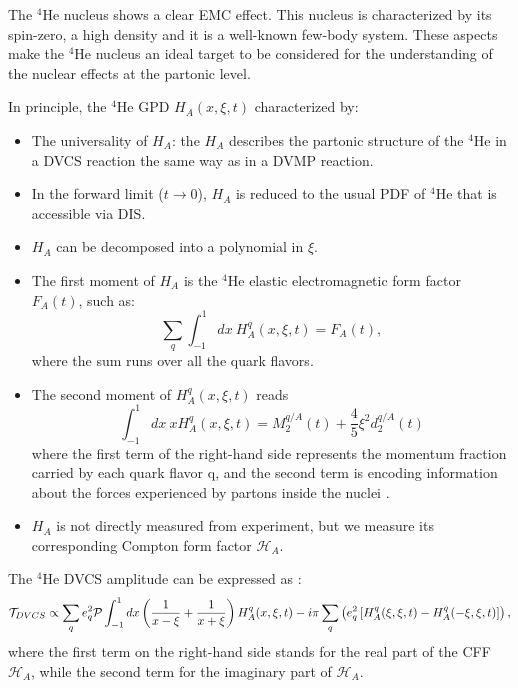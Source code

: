 The $^4$He nucleus shows a clear EMC effect. This nucleus is characterized by its spin-zero, a high density and it is a well-known few-body system. These aspects make the $^4$He nucleus an ideal target to be considered for the understanding of the nuclear effects at the partonic level.  
  
  In principle, the $^4$He GPD $H_{A}(x,\xi,t)$ characterized by:
 \begin{itemize}
 \item The universality of $H_{A}$: the $H_{A}$ describes the partonic structure of the $^4$He in a DVCS reaction the same way as in a DVMP reaction. 
 \item In the forward limit ($t\rightarrow 0$), $H_{A}$ is reduced to the usual PDF of $^4$He that is accessible via DIS.
 \item $H_{A}$ can be decomposed into a polynomial in $\xi$.
 \item The first moment of $H_{A}$ is the $^4$He elastic electromagnetic form factor $F_{A}(t)$, such as:
 \begin{equation}
   \sum_{q} \int_{-1}^{1} dx ~H_{A}^{q}(x, \xi, t) =  F_{A}(t),
\end{equation}
  where the sum runs over all the quark flavors.
  \item The second moment of $H_{A}^{q}(x, \xi, t)$ reads
  \begin{equation}
  \int_{-1}^{1} dx ~x H_{A}^{q}(x, \xi, t) = M ^{q/A}_{2}(t) + \frac{4}{5} \xi^{2} d^{q/A}_{2}(t)
  \end{equation}
    where the first term of the right-hand side represents the momentum fraction carried by each quark flavor q, and the second term is encoding information about the forces experienced by partons inside the nuclei \cite{M_Polyakov}. 
  \item $H_{A}$ is not directly measured from experiment, but we measure its corresponding Compton form factor $\mathcal{H}_{A}$. 
\end{itemize}  

The $^4$He DVCS amplitude can be expressed as \cite{Kir}:
 \begin{equation}
 \mathcal{T}_{DVCS} \propto \sum_{q} e^{2}_{q} \mathcal{P} \int_{-1}^{1} dx \left(\frac{1}{x-\xi} + \frac{1}{x+\xi} \right) H^{q}_{A}(x,\xi,t) \\- i\pi \sum_{q} \left( e^{2}_{q} \left[ H^{q}_{A}(\xi,\xi,t) - H^{q}_{A}(-\xi,\xi,t) \right] \right),
\end{equation}
 where the first term on the right-hand side stands for the real part of the CFF $\mathcal{H}_{A}$, while the second term for the imaginary part of $\mathcal{H}_{A}$.     


